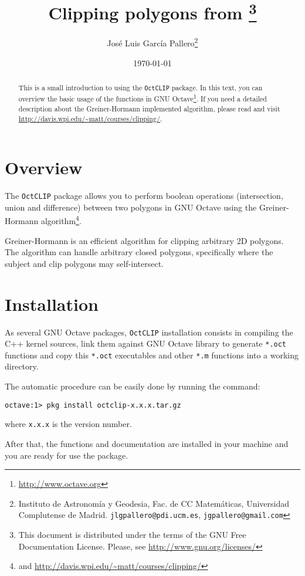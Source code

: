 \documentclass[10pt,a4paper]{article}
\title{Clipping polygons from \octave\footnote{This document is distributed
       under the terms of the GNU Free Documentation License. Please, see
       \url{http://www.gnu.org/licenses/}}}
\author{Jos\'e Luis Garc\'ia Pallero\footnote{Instituto de Astronom\'ia y
        Geodesia, Fac. de CC Matem\'aticas, Universidad Complutense de Madrid.
        \texttt{jlgpallero@pdi.ucm.es}, \texttt{jgpallero@gmail.com}}}
\date{\today}
\newcommand{\octclip}{\texttt{OctCLIP}}
\newcommand{\octave}{GNU Octave}
\begin{document}
\maketitle

\nocite{eat-om}
\nocite{kim2006a}

\begin{abstract}
This is a small introduction to using the \octclip{} package. In this text, you
can overview the basic usage of the functions in
\octave\footnote{\url{http://www.octave.org}}. If you need a detailed
description about the Greiner-Hormann implemented algorithm, please read
\cite{greiner1998} and visit \url{http://davis.wpi.edu/~matt/courses/clipping/}.
\end{abstract}

\section{Overview}

The \octclip{} package allows you to perform boolean operations (intersection,
union and difference) between two polygons in \octave{} using the
Greiner-Hormann algorithm\footnote{\cite{greiner1998} and
\url{http://davis.wpi.edu/~matt/courses/clipping/}}.

Greiner-Hormann is an efficient algorithm for clipping arbitrary 2D polygons.
The algorithm can handle arbitrary closed polygons, speciﬁcally where the
subject and clip polygons may self-intersect.

\section{Installation}

As several \octave{} packages, \octclip{} installation consists in compiling the
C++ kernel sources, link them against \octave{} library to generate
\texttt{*.oct} functions and copy this \texttt{*.oct} executables and other
\texttt{*.m} functions into a working directory.

The automatic procedure can be easily done by running the command:

\begin{verbatim}
octave:1> pkg install octclip-x.x.x.tar.gz
\end{verbatim}
where \texttt{x.x.x} is the version number.

After that, the functions and documentation are installed in your machine and
you are ready for use the package.
\end{document}

